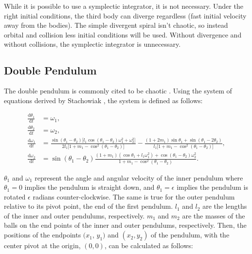 \documentclass{article}
\newcommand{\der}[2][t]{\frac{\mathrm{d}#2}{\mathrm{d}#1}}
\begin{document}
While it is possible to use a symplectic integrator, it is not necessary.
Under the right initial conditions, the third body can diverge regardless
(fast initial velocity away from the bodies). The simple divergent spiral
isn't chaotic, so instead orbital and collision less initial conditions will
be used. Without divergence and without collisions, the symplectic integrator
is unnecessary.

\subsection{Double Pendulum}

The double pendulum is commonly cited to be chaotic
\cite{stachowiak2006numerical} \cite{levien1993double}. Using the system of
equations derived by Stachowiak \cite{stachowiak2006numerical}, the system is
defined as follows:

\begin{align}
    \der{\theta_1} &= \omega_1, \nonumber \\
    \der{\theta_2} &= \omega_2, \nonumber \\
    \der{\omega_1} &= 
    \frac{
        \sin(\theta_1 - \theta_2) \lbrack
            l_1 \cos(\theta_1 - \theta_2) \omega_1^2 + \omega_2^2
        \rbrack
    }{
        2 l_1 \lbrack
            1 + m_1 - \cos^2(\theta_1 - \theta_2)
        \rbrack
    }
    -
    \frac{
        (1 + 2 m_1) \sin \theta_1 + \sin(\theta_1 - 2 \theta_2)
    }{
        l_1 \lbrack
            1 + m_1 - \cos^2(\theta_1 - \theta_2)
        \rbrack
    }
    , \nonumber \\
    \der{\omega_2} &= \sin (\theta_1 - \theta_2) 
    \frac{
        (1+m_1) (\cos \theta_1 + l_1 \omega_1^2)
        +
        \cos(\theta_1 - \theta_2) \omega_2^2
    }{
        1 + m_1 - \cos^2(\theta_1 - \theta_2)
    }. \label{eq:doub_pen}
\end{align}

$\theta_1$ and $\omega_1$ represent the angle and angular velocity of the
inner pendulum where $\theta_1=0$ implies the pendulum is straight down, and
$\theta_1=\epsilon$ implies the pendulum is rotated $\epsilon$ radians
counter-clockwise. The same is true for the outer pendulum relative to its
pivot point, the end of the first pendulum. $l_1$ and $l_2$ are the lengths
of the inner and outer pendulums, respectively. $m_1$ and $m_2$ are the
masses of the balls on the end points of the inner and outer pendulums,
respectively. Then, the positions of the endpoints $(x_1$, $y_1)$ and $(x_2,
y_2)$ of the pendulum, with the center pivot at the origin, $(0, 0)$, can be
calculated as follows:
\end{document}
